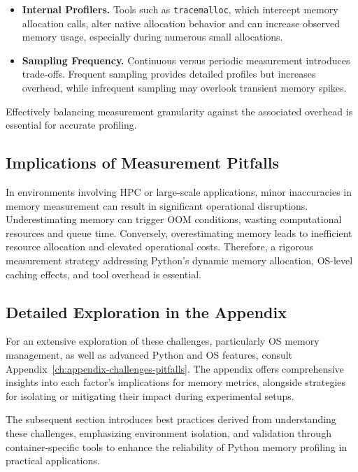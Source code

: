 \begin{itemize}

    \item \textbf{Internal Profilers.} Tools such as \texttt{tracemalloc}, which intercept memory allocation calls, alter native allocation behavior and can increase observed memory usage, especially during numerous small allocations.

    \item \textbf{Sampling Frequency.} Continuous versus periodic measurement introduces trade-offs. Frequent sampling provides detailed profiles but increases overhead, while infrequent sampling may overlook transient memory spikes.

\end{itemize}

Effectively balancing measurement granularity against the associated overhead is essential for accurate profiling.

\subsection{Implications of Measurement Pitfalls}
\label{subsec:mmc-challenges-why-care}

In environments involving \ac{HPC} or large-scale applications, minor inaccuracies in memory measurement can result in significant operational disruptions.
Underestimating memory can trigger \ac{OOM} conditions, wasting computational resources and queue time.
Conversely, overestimating memory leads to inefficient resource allocation and elevated operational costs.
Therefore, a rigorous measurement strategy addressing Python’s dynamic memory allocation, \ac{OS}-level caching effects, and tool overhead is essential.

\subsection{Detailed Exploration in the Appendix}
\label{subsec:mmc-challenges-appendix-ref}

For an extensive exploration of these challenges, particularly \ac{OS} memory management, as well as advanced Python and \ac{OS} features, consult Appendix~\ref{ch:appendix-challenges-pitfalls}.
The appendix offers comprehensive insights into each factor's implications for memory metrics, alongside strategies for isolating or mitigating their impact during experimental setups.

The subsequent section introduces best practices derived from understanding these challenges, emphasizing environment isolation, and validation through container-specific tools to enhance the reliability of Python memory profiling in practical applications.